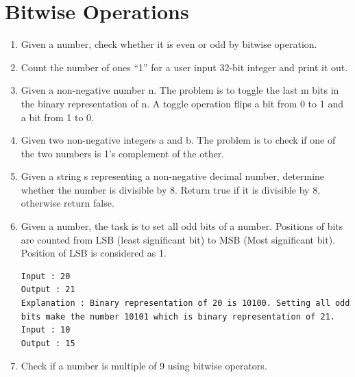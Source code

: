 \documentclass[11pt]{article}
\begin{document}
\section{Bitwise Operations}
\begin{enumerate}
	\item {Given a number, check whether it is even or odd by bitwise operation.}
    \item {Count the number of ones ``1'' for a user input 32-bit integer and print it out.}
    \item {Given a non-negative number n. The problem is to toggle the last m bits in the binary representation of n. A toggle operation flips a bit from 0 to 1 and a bit from 1 to 0.}
    \item {Given two non-negative integers a and b. The problem is to check if one of the two numbers is 1's complement of the other.}
    \item {Given a string s representing a non-negative decimal number, determine whether the number is divisible by 8. Return true if it is divisible by 8, otherwise return false.}
    \item {Given a number, the task is to set all odd bits of a number. Positions of bits are counted from LSB (least significant bit) to MSB (Most significant bit). Position of LSB is considered as 1.}
\begin{lstlisting}
Input : 20
Output : 21
Explanation : Binary representation of 20 is 10100. Setting all odd bits make the number 10101 which is binary representation of 21.
Input : 10
Output : 15
\end{lstlisting}
	\item {Check if a number is multiple of 9 using bitwise operators.}
\end{enumerate}
\end{document}
